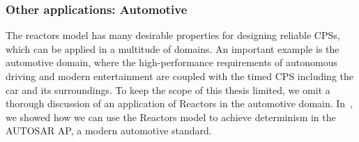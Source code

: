 \subsubsection{Other applications: Automotive}

The reactors model has many desirable properties for designing reliable \acp{CPS}, which can be applied in a multitude of domains.
An important example is the automotive domain, where the high-performance requirements of autonomous driving and modern entertainment are coupled with the timed \ac{CPS} including the car and its surroundings.
To keep the scope of this thesis limited, we omit a thorough discussion of an application of Reactors in the automotive domain.
In~\cite{menard_date20}, we showed how we can use the Reactors model to achieve determinism in the AUTOSAR \ac{AP}, a modern automotive standard.
